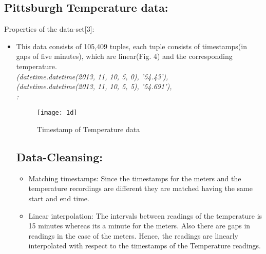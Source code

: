 \documentclass[a4paper,11pt]{article}
\begin{document}
\subsection{Pittsburgh Temperature data:}
Properties of the data-set[3]:
\begin{itemize}
\item This data consists of 105,409 tuples, each tuple consists of timestamps(in gaps of five minutes), which are linear(Fig. 4) and the corresponding temperature.\\
\emph{(datetime.datetime(2013, 11, 10, 5, 0), '54.43'),\\ (datetime.datetime(2013, 11, 10, 5, 5), '54.691'),\\:}
\begin{figure}[H]
\centering
  \texttt{[image: 1d]}
  \caption{Timestamp of Temperature data}
\end{figure}
\subsection{Data-Cleansing:}
\begin{itemize}
\itemsep0em
\item Matching timestamps: Since the timestamps for the meters and the temperature recordings are different they are matched having the same start and end time.
\item Linear interpolation: The intervals between readings of the temperature is 15 minutes whereas its a minute for the meters. Also there are gaps in readings in the case of the meters. Hence, the readings are linearly interpolated with respect to the timestamps of the Temperature readings.
\end{itemize}

\end{itemize}
\end{document}
